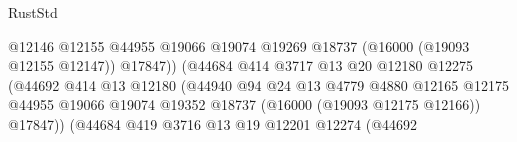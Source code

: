 \begin{lexlean}{RustStd}
\begin{coremodule}
                                                      @12146
                                                      @12155
                                                      @44955
                                                      @19066
                                                      @19074
                                                      @19269
                                                      @18737
                                                      (@16000 (@19093 @12155 @12147))
                                                      @17847))
                                                  (@44684
                                                    @414
                                                    @3717
                                                    @13
                                                    @20
                                                    @12180
                                                    @12275
                                                    (@44692
                                                      @414
                                                      @13
                                                      @12180
                                                      (@44940
                                                        @94
                                                        @24
                                                        @13
                                                        @4779
                                                        @4880
                                                        @12165
                                                        @12175
                                                        @44955
                                                        @19066
                                                        @19074
                                                        @19352
                                                        @18737
                                                        (@16000 (@19093 @12175 @12166))
                                                        @17847))
                                                    (@44684
                                                      @419
                                                      @3716
                                                      @13
                                                      @19
                                                      @12201
                                                      @12274
                                                      (@44692

\end{coremodule}
\end{lexlean}
